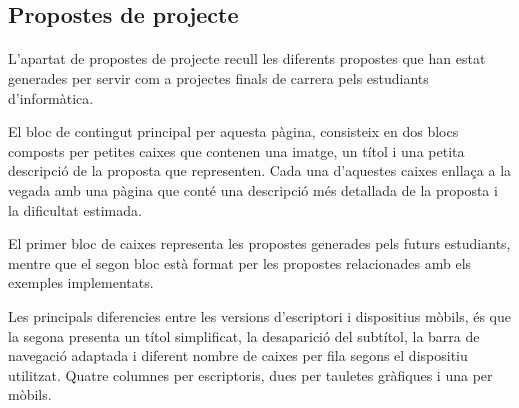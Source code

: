 \subsection{Propostes de projecte}\label{sec:proposals}

    \paragraph{}
    L'apartat de propostes de projecte recull les diferents propostes que han estat generades per servir com a projectes finals de carrera pels estudiants d'informàtica.

    El bloc de contingut principal per aquesta pàgina, consisteix en dos blocs composts per petites caixes que contenen una imatge, un títol i una petita descripció de la proposta que representen. Cada una d'aquestes caixes enllaça a la vegada amb una pàgina que conté una descripció més detallada de la proposta i la dificultat estimada.

    El primer bloc de caixes representa les propostes generades pels futurs estudiants, mentre que el segon bloc està format per les propostes relacionades amb els exemples implementats.

    Les principals diferencies entre les versions d'escriptori i dispositius mòbils, és que la segona presenta un títol simplificat, la desaparició del subtítol, la barra de navegació adaptada i diferent nombre de caixes per fila segons el dispositiu utilitzat. Quatre columnes per escriptoris, dues per tauletes gràfiques i una per mòbils.
